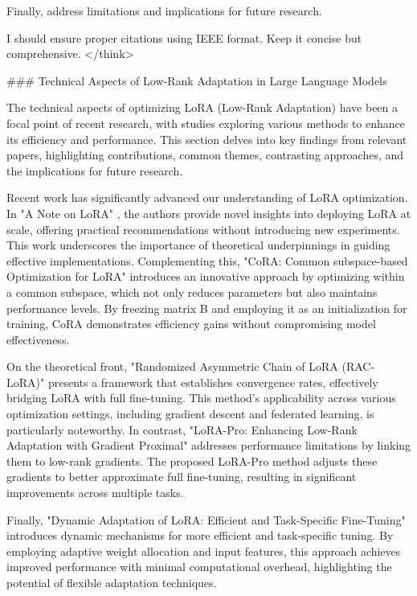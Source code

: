 \documentclass[conference]{IEEEtran}
\begin{document}
Finally, address limitations and implications for future research.

I should ensure proper citations using IEEE format. Keep it concise but comprehensive.
</think>

### Technical Aspects of Low-Rank Adaptation in Large Language Models

The technical aspects of optimizing LoRA (Low-Rank Adaptation) have been a focal point of recent research, with studies exploring various methods to enhance its efficiency and performance. This section delves into key findings from relevant papers, highlighting contributions, common themes, contrasting approaches, and the implications for future research.

Recent work has significantly advanced our understanding of LoRA optimization. In "A Note on LoRA" \cite{b1}, the authors provide novel insights into deploying LoRA at scale, offering practical recommendations without introducing new experiments. This work underscores the importance of theoretical underpinnings in guiding effective implementations. Complementing this, "CoRA: Common subspace-based Optimization for LoRA" \cite{b2} introduces an innovative approach by optimizing within a common subspace, which not only reduces parameters but also maintains performance levels. By freezing matrix B and employing it as an initialization for training, CoRA demonstrates efficiency gains without compromising model effectiveness.

On the theoretical front, "Randomized Asymmetric Chain of LoRA (RAC-LoRA)" \cite{b3} presents a framework that establishes convergence rates, effectively bridging LoRA with full fine-tuning. This method's applicability across various optimization settings, including gradient descent and federated learning, is particularly noteworthy. In contrast, "LoRA-Pro: Enhancing Low-Rank Adaptation with Gradient Proximal" \cite{b4} addresses performance limitations by linking them to low-rank gradients. The proposed LoRA-Pro method adjusts these gradients to better approximate full fine-tuning, resulting in significant improvements across multiple tasks.

Finally, "Dynamic Adaptation of LoRA: Efficient and Task-Specific Fine-Tuning" \cite{b5} introduces dynamic mechanisms for more efficient and task-specific tuning. By employing adaptive weight allocation and input features, this approach achieves improved performance with minimal computational overhead, highlighting the potential of flexible adaptation techniques.
\end{document}
